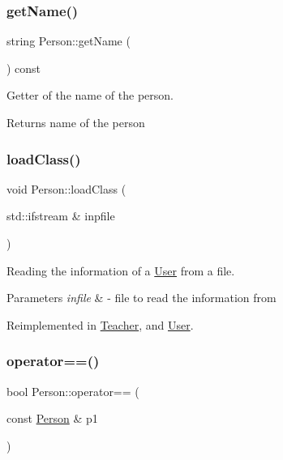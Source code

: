 \subsubsection{\texorpdfstring{get\+Name()}{getName()}}
{\footnotesize\ttfamily string Person\+::get\+Name (\begin{DoxyParamCaption}{ }\end{DoxyParamCaption}) const}



Getter of the name of the person. 

\begin{DoxyReturn}{Returns}
name of the person 
\end{DoxyReturn}
\mbox{\label{class_person_af07a032df8d56dddade4dc43960b536b}} 
\subsubsection{\texorpdfstring{load\+Class()}{loadClass()}}
{\footnotesize\ttfamily void Person\+::load\+Class (\begin{DoxyParamCaption}\item[{std\+::ifstream \&}]{inpfile }\end{DoxyParamCaption})\hspace{0.3cm}{\ttfamily [virtual]}}



Reading the information of a \mbox{\hyperlink{class_user}{User}} from a file. 


\begin{DoxyParams}{Parameters}
{\em infile} & -\/ file to read the information from \\
\hline
\end{DoxyParams}


Reimplemented in \mbox{\hyperlink{class_teacher_a1f204644af41c43ff3bd0582393062fa}{Teacher}}, and \mbox{\hyperlink{class_user_abc12a9ca668bd860a3d6d2ae4791997d}{User}}.

\mbox{\label{class_person_aa2fe338cbcf08ee5981dce811fd3a50a}} 
\subsubsection{\texorpdfstring{operator==()}{operator==()}}
{\footnotesize\ttfamily bool Person\+::operator== (\begin{DoxyParamCaption}\item[{const \mbox{\hyperlink{class_person}{Person}} \&}]{p1 }\end{DoxyParamCaption})}



